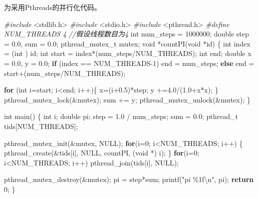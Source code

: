 \documentclass[]{ctexbook}
\newenvironment{Shaded}{\begin{snugshade}}{\end{snugshade}}
\newcommand{\CommentTok}[1]{\textcolor[rgb]{0.56,0.35,0.01}{\textit{#1}}}
\newcommand{\ControlFlowTok}[1]{\textcolor[rgb]{0.13,0.29,0.53}{\textbf{#1}}}
\newcommand{\DataTypeTok}[1]{\textcolor[rgb]{0.13,0.29,0.53}{#1}}
\newcommand{\DecValTok}[1]{\textcolor[rgb]{0.00,0.00,0.81}{#1}}
\newcommand{\FloatTok}[1]{\textcolor[rgb]{0.00,0.00,0.81}{#1}}
\newcommand{\ImportTok}[1]{#1}
\newcommand{\NormalTok}[1]{#1}
\newcommand{\PreprocessorTok}[1]{\textcolor[rgb]{0.56,0.35,0.01}{\textit{#1}}}
\newcommand{\SpecialCharTok}[1]{\textcolor[rgb]{0.00,0.00,0.00}{#1}}
\newcommand{\StringTok}[1]{\textcolor[rgb]{0.31,0.60,0.02}{#1}}
\begin{document}
为采用Pthreads的并行化代码。

\begin{Shaded}
\begin{Highlighting}[]
\PreprocessorTok{\#include }\ImportTok{\textless{}stdlib.h\textgreater{}}
\PreprocessorTok{\#include }\ImportTok{\textless{}stdio.h\textgreater{}}
\PreprocessorTok{\#include }\ImportTok{\textless{}pthread.h\textgreater{}}
\PreprocessorTok{\#define NUM\_THREADS 4 }\CommentTok{//假设线程数目为4}
\DataTypeTok{int}\NormalTok{ num\_steps = }\DecValTok{1000000}\NormalTok{;}
\DataTypeTok{double}\NormalTok{ step = }\FloatTok{0.0}\NormalTok{, sum = }\FloatTok{0.0}\NormalTok{;}
\NormalTok{pthread\_mutex\_t mutex;}
\DataTypeTok{void}\NormalTok{ *countPI(}\DataTypeTok{void}\NormalTok{ *id) \{}
    \DataTypeTok{int}\NormalTok{ index = (}\DataTypeTok{int}\NormalTok{ ) id;}
    \DataTypeTok{int}\NormalTok{ start = index*(num\_steps/NUM\_THREADS);}
    \DataTypeTok{int}\NormalTok{ end;}
    \DataTypeTok{double}\NormalTok{ x = }\FloatTok{0.0}\NormalTok{, y = }\FloatTok{0.0}\NormalTok{;}
    \ControlFlowTok{if}\NormalTok{ (index == NUM\_THREADS{-}}\DecValTok{1}\NormalTok{)}
\NormalTok{        end = num\_steps;}
    \ControlFlowTok{else}
\NormalTok{        end = start+(num\_steps/NUM\_THREADS);}

    \ControlFlowTok{for}\NormalTok{ (}\DataTypeTok{int}\NormalTok{ i=start; i\textless{}end; i++)\{}
\NormalTok{        x=(i+}\FloatTok{0.5}\NormalTok{)*step;}
\NormalTok{        y +=}\FloatTok{4.0}\NormalTok{/(}\FloatTok{1.0}\NormalTok{+x*x);}
\NormalTok{    \}}
\NormalTok{    pthread\_mutex\_lock(\&mutex);}
\NormalTok{    sum += y;}
\NormalTok{    pthread\_mutex\_unlock(\&mutex);}
\NormalTok{\}}

\DataTypeTok{int}\NormalTok{ main() \{}
    \DataTypeTok{int}\NormalTok{ i;}
    \DataTypeTok{double}\NormalTok{ pi;}
\NormalTok{    step = }\FloatTok{1.0}\NormalTok{ / num\_steps;}
\NormalTok{    sum = }\FloatTok{0.0}\NormalTok{;}
\NormalTok{    pthread\_t tids[NUM\_THREADS];}

\NormalTok{    pthread\_mutex\_init(\&mutex, NULL);}
    \ControlFlowTok{for}\NormalTok{(i=}\DecValTok{0}\NormalTok{; i\textless{}NUM\_THREADS; i++) \{}
\NormalTok{        pthread\_create(\&tids[i], NULL, countPI, (}\DataTypeTok{void}\NormalTok{ *) i);}
\NormalTok{    \}}
    \ControlFlowTok{for}\NormalTok{(i=}\DecValTok{0}\NormalTok{; i\textless{}NUM\_THREADS; i++)}
\NormalTok{        pthread\_join(tids[i], NULL);}

\NormalTok{    pthread\_mutex\_destroy(\&mutex);}
\NormalTok{    pi = step*sum;}
\NormalTok{    printf(}\StringTok{"pi \%1f}\SpecialCharTok{\textbackslash{}n}\StringTok{"}\NormalTok{, pi);}
    \ControlFlowTok{return} \DecValTok{0}\NormalTok{;}
\NormalTok{\}}
\end{Highlighting}
\end{Shaded}
\end{document}
